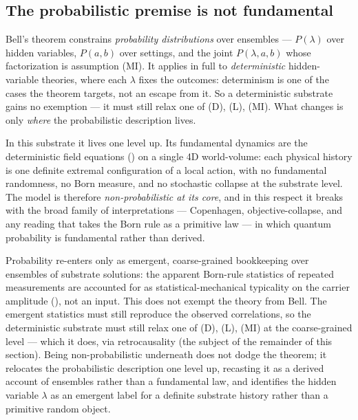 \subsection{The probabilistic premise is not fundamental}
\label{subsec:non-probabilistic}

Bell's theorem constrains \emph{probability distributions} over ensembles --- $P(\lambda)$ over
hidden variables, $P(a,b)$ over settings, and the joint $P(\lambda,a,b)$ whose factorization is
assumption (MI). It applies in full to \emph{deterministic} hidden-variable theories, where each
$\lambda$ fixes the outcomes: determinism is one of the cases the theorem targets, not an escape
from it. So a deterministic substrate gains no exemption --- it must still relax one of (D), (L),
(MI). What changes is only \emph{where} the probabilistic description lives.

In this substrate it lives one level up. Its fundamental dynamics are the deterministic field
equations () on a single 4D world-volume: each physical history is one definite
extremal configuration of a local action, with no fundamental randomness, no Born measure, and no
stochastic collapse at the substrate level. The model is therefore \emph{non-probabilistic at its core}, and
in this respect it breaks with the broad family of interpretations --- Copenhagen,
objective-collapse, and any reading that takes the Born rule as a primitive law --- in which
quantum probability is fundamental rather than derived.

Probability re-enters only as emergent, coarse-grained bookkeeping over ensembles of substrate
solutions: the apparent Born-rule statistics of repeated measurements are accounted for as
statistical-mechanical typicality on the carrier amplitude (), not
an input. This does not exempt
the theory from Bell. The emergent statistics must still reproduce the observed correlations, so
the deterministic substrate must still relax one of (D), (L), (MI) at the coarse-grained level ---
which it does, via retrocausality (the subject of the remainder of this section). Being
non-probabilistic underneath does not dodge the theorem; it relocates the probabilistic
description one level up, recasting it as a derived account of ensembles rather than a fundamental
law, and identifies the hidden variable $\lambda$ as an emergent label for a definite substrate
history rather than a primitive random object.

